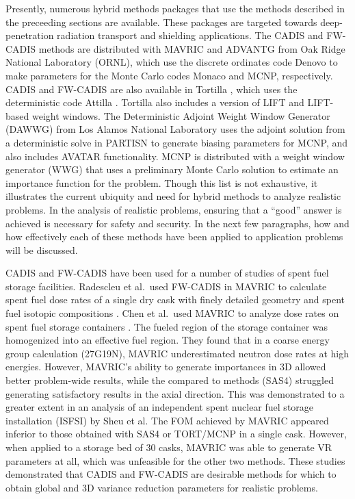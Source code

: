 Presently, numerous hybrid methods packages that use the methods described in
the preceeding sections are available. These packages are targeted towards
deep-penetration radiation transport and shielding applications.
The CADIS and FW-CADIS methods are distributed with MAVRIC \cite{SCALE6_1,
peplow_advanced_2007} and
ADVANTG \cite{mosher_automated_2009} from Oak Ridge National Laboratory (ORNL), which
use the discrete ordinates code Denovo \cite{evans_denovo:_2010} to make parameters for
the Monte Carlo codes Monaco \cite{SCALE6_1} and MCNP\cite{mcnp_manual_v1},
respectively. CADIS and FW-CADIS are also available in Tortilla
\cite{somasundaram_implementation_2013},
which uses the deterministic code Attilla
\cite{lucas_applications_2004}. Tortilla also includes a version of LIFT and
LIFT-based weight windows.
The Deterministic Adjoint Weight Window
Generator (DAWWG) from Los Alamos National Laboratory
\cite{sweezy_automated_2005} uses the adjoint solution
from a deterministic solve in
PARTISN \cite{alcouffe_partisn_2002}
to generate biasing parameters for MCNP, and also includes AVATAR
functionality. MCNP \cite{mcnp_manual_v1} is distributed with a weight window
generator (WWG) that uses a preliminary Monte Carlo solution to estimate an
importance function for the problem. Though this list is not exhaustive, it
illustrates the current ubiquity and need for hybrid methods to analyze
realistic problems. In the analysis of realistic problems, ensuring that a
``good'' answer is achieved is necessary for safety and security. In the next
few paragraphs, how and how effectively each of these methods have been applied to application problems
will be discussed. 

CADIS and FW-CADIS have been used for a number of studies of spent fuel storage
facilities.
Radescleu et al.\ used FW-CADIS in MAVRIC to calculate spent fuel
dose rates of a single dry cask
with finely detailed geometry and spent fuel isotopic compositions
\cite{radulescu_dose_2013}.
Chen et al.\ used MAVRIC \cite{SCALE6_1} to analyze dose rates on spent fuel
storage containers \cite{chen_surface_2011}. The fueled region of the storage
container was homogenized into an effective fuel region.
They found that in a coarse energy
group calculation (27G19N), MAVRIC underestimated neutron dose rates at high
energies. However, MAVRIC's ability to generate importances in 3D
allowed better problem-wide results, while the compared to methods
(SAS4) struggled generating satisfactory results in the axial direction. This
was demonstrated to a greater extent in an analysis of an independent spent
nuclear fuel storage installation (ISFSI) \cite{sheu_dose_2011} by Sheu et al.
The FOM
achieved by MAVRIC appeared inferior to those obtained with SAS4 or TORT/MCNP in
a single cask. However, when applied to a storage bed of 30 casks, MAVRIC was able to
generate VR parameters at all, which was unfeasible for the other two methods. These
studies demonstrated that CADIS and FW-CADIS are desirable methods for which to
obtain global and 3D variance reduction parameters for realistic
problems.

